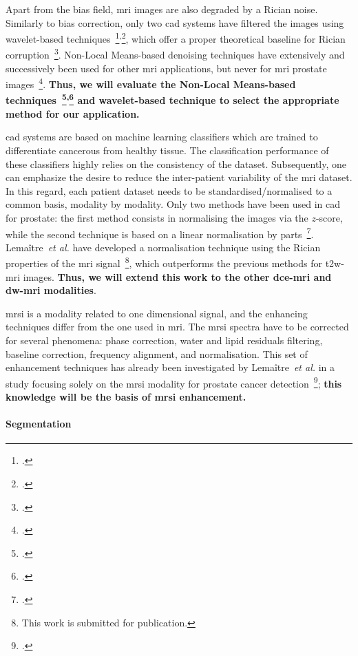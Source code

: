 Apart from the bias field, \Ac{mri} images are also degraded by a Rician noise. 
Similarly to bias correction, only two \ac{cad} systems have filtered the images using wavelet-based techniques~\footcite{Mallat2008}\textsuperscript{,}\footcite{Pizurica2003}, which offer a proper theoretical baseline for Rician corruption~\footcite{Nowak1999}.
Non-Local Means-based denoising techniques have extensively and successively been used for other \ac{mri} applications, but never for \ac{mri} prostate images~\footcite{Manjon2008}.
\textbf{Thus, we will evaluate the Non-Local Means-based techniques~\footcite{Manjon2012}\textsuperscript{,}\footcite{Coupe2011} and wavelet-based technique to select the appropriate method for our application.}

\ac{cad} systems are based on machine learning classifiers which are trained to differentiate cancerous from healthy tissue.
The classification performance of these classifiers highly relies on the consistency of the dataset.
Subsequently, one can emphasize the desire to reduce the inter-patient variability of the \ac{mri} dataset.
In this regard, each patient dataset needs to be standardised/normalised to a common basis, modality by modality.
Only two methods have been used in \ac{cad} for prostate: the first method consists in normalising the images via the $z$-score, while the second technique is based on a linear normalisation by parts~\footcite{Madabhushi2006a}.
Lema\^itre~\emph{et al.} have developed a normalisation technique using the Rician properties of the \ac{mri} signal~\footnote{This work is submitted for publication.}, which outperforms the previous methods for \ac{t2w}-\ac{mri} images.
\textbf{Thus, we will extend this work to the other \ac{dce}-\ac{mri} and \ac{dw}-\ac{mri} modalities}.

\ac{mrsi} is a modality related to one dimensional signal, and the enhancing techniques differ from the one used in \ac{mri}.
The \ac{mrsi} spectra have to be corrected for several phenomena: phase correction, water and lipid residuals filtering, baseline correction, frequency alignment, and normalisation.
This set of enhancement techniques has already been investigated by Lema\^itre~\emph{et al.} in a study focusing solely on the \ac{mrsi} modality for prostate cancer detection~\footcite{Lemaitre2011}; \textbf{this knowledge will be the basis of \ac{mrsi} enhancement.}

\paragraph{Segmentation}

